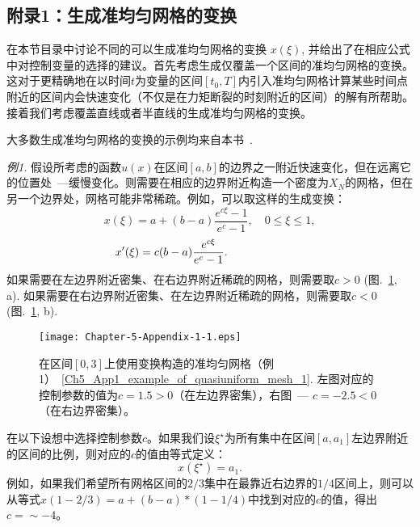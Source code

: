 \documentclass[twoside]{book}
\begin{document}
\begin{CJK*}{GBK}{song}
\section{附录1：生成准均匀网格的变换}\label{Appendix_5_a}

在本节目录中讨论不同的可以生成准均匀网格的变换 $x(\xi)$, 并给出了在相应公式中对控制变量的选择的建议。首先考虑生成仅覆盖一个区间的准均匀网格的变换。这对于更精确地在以时间$t$为变量的区间$[t_0,T]$内引入准均匀网格计算某些时间点附近的区间内会快速变化（不仅是在力矩断裂的时刻附近的区间）的解有所帮助。接着我们考虑覆盖直线或者半直线的生成准均匀网格的变换。

大多数生成准均匀网格的变换的示例均来自本书~\cite{Kalitkin_book_3}.

\bigskip
\emph{例1.} 假设所考虑的函数$u(x)$在区间$[a,b]$的边界之一附近快速变化，但在远离它的位置处~---缓慢变化。则需要在相应的边界附近构造一个密度为$X_N$的网格，但在另一个边界处，网格可能非常稀疏。例如，可以取这样的生成变换：
\begin{equation}
    \label{Ch5_App1_example_of_quasiuniform_mesh_1}
    x(\xi) = a + (b - a)\dfrac{e^{c\xi} - 1}{e^c - 1}, \quad 0 \leqslant \xi \leqslant 1,
\end{equation}
\begin{equation*}
    \hspace{-2.4cm}
    x'(\xi) = c(b - a)\dfrac{e^{c\xi}}{e^c - 1}.
\end{equation*}
如果需要在左边界附近密集、在右边界附近稀疏的网格，则需要取$c > 0$ (图.~\ref{Fig_5_App1_1}, a). 如果需要在右边界附近密集、在左边界附近稀疏的网格，则需要取$c < 0$ (图.~\ref{Fig_5_App1_1}, b).
\begin{figure}[t]
    \centering
    \texttt{[image: Chapter-5-Appendix-1-1.eps]}\\
    \caption{在区间$[0,3]$上使用变换构造的准均匀网格（例1）~\eqref{Ch5_App1_example_of_quasiuniform_mesh_1}. 左图对应的控制参数的值为$c = 1.5 > 0$（在左边界密集），右图~---  $c = -2.5 < 0$（在右边界密集）。}
    \label{Fig_5_App1_1}
\end{figure}

在以下设想中选择控制参数$c$。如果我们设$\xi^\star$为所有集中在区间$[a,a_1]$左边界附近的区间的比例，则对应的$c$的值由等式定义：
\begin{equation*}
    x(\xi^\star) = a_1.
\end{equation*}
例如，如果我们希望所有网格区间的$2/3$集中在最靠近右边界的$1/4$区间上，则可以从等式$ x(1 - 2/3) = a + (b - a)*(1 - 1/4)$中找到对应的$c$的值，得出$c =\sim -4$。


\end{CJK*}
\end{document}
